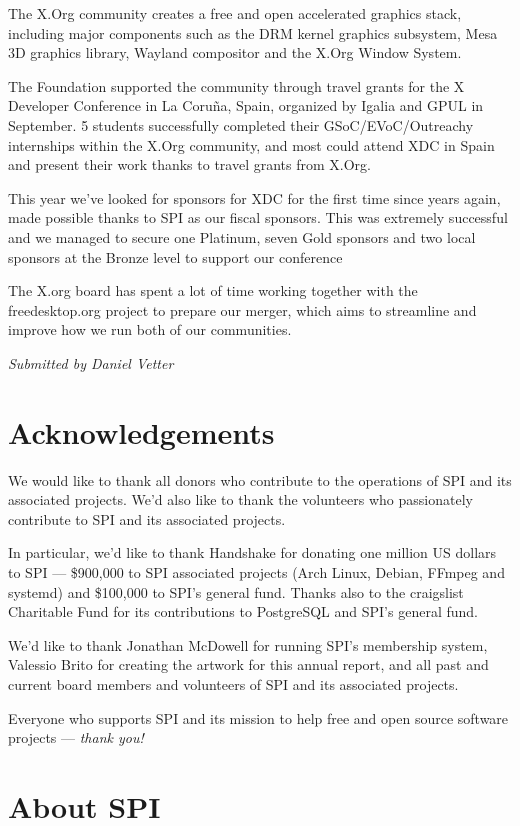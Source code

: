 \documentclass[a4paper]{report}
\begin{document}
The X.Org community creates a free and open accelerated graphics stack,
including major components such as the DRM kernel graphics subsystem,
Mesa 3D graphics library, Wayland compositor and the X.Org Window
System.

The Foundation supported the community through travel grants for the X
Developer Conference in La Coruña, Spain, organized by Igalia and GPUL
in September. 5 students successfully completed their
GSoC/EVoC/Outreachy internships within the X.Org community, and most
could attend XDC in Spain and present their work thanks to travel grants
from X.Org.

This year we've looked for sponsors for XDC for the first time since
years again, made possible thanks to SPI as our fiscal sponsors. This
was extremely successful and we managed to secure one Platinum, seven
Gold sponsors and two local sponsors at the Bronze level to support our
conference

The X.org board has spent a lot of time working together with the
freedesktop.org project to prepare our merger, which aims to streamline
and improve how we run both of our communities.

{\em Submitted by Daniel Vetter}


\chapter{Acknowledgements}

We would like to thank all donors who contribute to the operations of
SPI and its associated projects.  We'd also like to thank the volunteers
who passionately contribute to SPI and its associated projects.

In particular, we'd like to thank Handshake for donating one million US
dollars to SPI --- \$900,000 to SPI associated projects (Arch Linux,
Debian, FFmpeg and systemd) and \$100,000 to SPI's general fund.  Thanks
also to the craigslist Charitable Fund for its contributions to
PostgreSQL and SPI's general fund.

We'd like to thank Jonathan McDowell for running SPI's membership
system, Valessio Brito for creating the artwork for this annual report,
and all past and current board members and volunteers of SPI and its
associated projects.

Everyone who supports SPI and its mission to help free and open source
software projects --- {\em thank you!}


\appendix
\chapter{About SPI}
\end{document}
